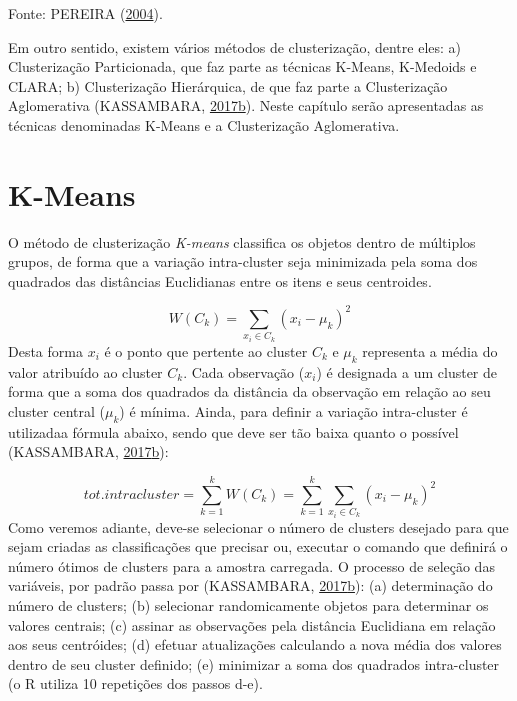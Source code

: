 \documentclass[12pt,brazil,oneside]{book}
\begin{document}
Fonte: PEREIRA (\protect\hyperlink{ref-Pereira2004a}{2004}).

Em outro sentido, existem vários métodos de clusterização, dentre eles: a) Clusterização Particionada, que faz parte as técnicas K-Means, K-Medoids e CLARA; b) Clusterização Hierárquica, de que faz parte a Clusterização Aglomerativa (KASSAMBARA, \protect\hyperlink{ref-Kassambara2017}{2017}\protect\hyperlink{ref-Kassambara2017}{b}). Neste capítulo serão apresentadas as técnicas denominadas K-Means e a Clusterização Aglomerativa.

\hypertarget{k-means}{%
\section{K-Means}\label{k-means}}

O método de clusterização \emph{K-means} classifica os objetos dentro de múltiplos grupos, de forma que a variação intra-cluster seja minimizada pela soma dos quadrados das distâncias Euclidianas entre os itens e seus centroides.

\[
W(C_k)=\sum _{x_i\in C_k}(x_i-\mu _k)^2
\]
Desta forma \(x_i\) é o ponto que pertente ao cluster \(C_k\) e \(\mu _k\) representa a média do valor atribuído ao cluster \(C_k\). Cada observação (\(x_i\)) é designada a um cluster de forma que a soma dos quadrados da distância da observação em relação ao seu cluster central (\(\mu _k\)) é mínima. Ainda, para definir a variação intra-cluster é utilizadaa fórmula abaixo, sendo que deve ser tão baixa quanto o possível (KASSAMBARA, \protect\hyperlink{ref-Kassambara2017}{2017}\protect\hyperlink{ref-Kassambara2017}{b}):

\[
tot.intracluster=\sum_{k=1}^{k} W(C_k)=\sum_{k=1}^{k}\sum _{x_i\in C_k}(x_i-\mu _k)^2
\]
Como veremos adiante, deve-se selecionar o número de clusters desejado para que sejam criadas as classificações que precisar ou, executar o comando que definirá o número ótimos de clusters para a amostra carregada. O processo de seleção das variáveis, por padrão passa por (KASSAMBARA, \protect\hyperlink{ref-Kassambara2017}{2017}\protect\hyperlink{ref-Kassambara2017}{b}): (a) determinação do número de clusters; (b) selecionar randomicamente objetos para determinar os valores centrais; (c) assinar as observações pela distância Euclidiana em relação aos seus centróides; (d) efetuar atualizações calculando a nova média dos valores dentro de seu cluster definido; (e) minimizar a soma dos quadrados intra-cluster (o R utiliza 10 repetições dos passos d-e).
\end{document}
